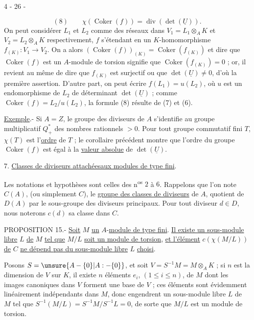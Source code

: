 \begin{center}4 - 26 -\end{center}
\[
 (8)\qquad \chi(\operatorname{Coker}(f))=\operatorname{div}(\det(\underline{U})).
\]
On peut considérer $L_1$ et $L_2$ comme des réseaux dans $V_1=L_1\otimes_A K$ et $V_2=L_2\otimes_A K$ respectivement, $f$ s'étendant en un $K$-homomorphisme $f_{(K)}:V_1\longrightarrow V_2$. On a alors $(\operatorname{Coker}(f))_{(K)}=\operatorname{Coker}(f_{(K)})$ et dire que $\operatorname{Coker}(f)$ est un $A$-module de torsion signifie que $\operatorname{Coker}(f_{(K)})=0$ ; or, il revient au même de dire que $f_{(K)}$ est surjectif ou que $\det(\underline{U})\ne0$, d'où la première assertion. D'autre part, on peut écrire $f(L_1)=u(L_2)$, où $u$ est un endomorphisme de $L_2$ de déterminant $\det(\underline{U})$ ; comme $\operatorname{Coker}(f)=L_2/u(L_2)$, la formule (8) résulte de (7) et (6).

\uline{Exemple}.- Si $A=Z$, le groupe des diviseurs de $A$ s'identifie au groupe multiplicatif $Q_+^*$ des nombres rationnels $>0$. Pour tout groupe commutatif fini $T$, $\chi(T)$ est l'\uline{ordre} de $T$ ; le corollaire précédent montre que l'ordre du groupe $\operatorname{Coker}(f)$ est égal à la \uline{valeur absolue} de $\det(\underline{U})$.

7. \uline{Classes de diviseurs attachéesaux modules de type fini}.

Les notations et hypothèses sont celles des n\textsuperscript{os} $2$ à $6$. Rappelons que l'on note $C(A)$, (ou simplement $C$), le \uline{groupe des classes de diviseurs} de $A$, quotient de $D(A)$ par le sous-groupe des diviseurs principaux. Pour tout diviseur $d\in D$, nous noterons $c(d)$ sa classe dans $C$.

PROPOSITION 15.- \uline{Soit} $M$ \uline{un} $A$-\uline{module de type fini}. \uline{Il existe un sous-module libre} $L$ \uline{de} $M$ \uline{tel que} $M/L$ \uline{soit un module de torsion}, \uline{et l'élément} $c(\chi(M/L))$ \uline{de} $C$ \uline{ne dépend pas du sous-module libre} $L$ \uline{choisi}.

Posons $S=\unsure{A-\{0\}|A:-\{0\}}$, et soit $V=S^{-1}M=M\otimes_A K$ ; si $n$ est la dimension de $V$ sur $K$, il existe $n$ éléments $e_i$, $(1\le i\le n)$, de $M$ dont les images canoniques dans $V$ forment une base de $V$ ; ces éléments sont évidemment linéairement indépendants dans $M$, donc engendrent un sous-module libre $L$ de $M$ tel que $S^{-1}(M/L)=S^{-1}M/S^{-1}L=0$, de sorte que $M/L$ est un module de torsion.
